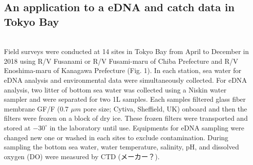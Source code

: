 \documentclass[12pt]{article}
\begin{document}
\begin{linenumbers}
\subsection{An application to a eDNA and catch data in Tokyo Bay}
\\
Field surveys were conducted at 14 sites in Tokyo Bay from April to December in 2018 using R/V Fusanami or R/V Fusami-maru of Chiba Prefecture and R/V Enoshima-maru of Kanagawa Prefecture (Fig. 1). In each station, sea water for eDNA analysis and environmental data were simultaneously collected. For eDNA analysis, two litter of bottom sea water was collected using a Niskin water sampler and were separated for two 1L samples. Each samples filtered glass fiber membrane GF/F (0.7 $\mu m$ pore size; Cytiva, Sheffield, UK) onboard and then the filters were frozen on a block of dry ice. These frozen filters were transported and stored at $-30^\circ$ in the laboratory until use. Equipments for eDNA sampling were changed new one or washed in each sites to exclude contamination. During sampling the bottom sea water, water temperature, salinity, pH, and dissolved oxygen (DO) were measured by CTD (メーカー？).



\end{linenumbers}
\end{document}
